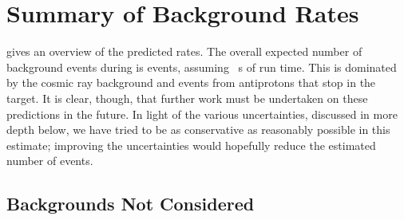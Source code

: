 %

\section{Summary of Background Rates}
\TabBackgroundFinalVals
{} gives an overview of the predicted rates.
The overall expected number of background events during \phaseII is \VarTotalBgPhasII events, assuming \VarRunTime~s of run time.
This is dominated by the cosmic ray background and events from antiprotons that stop in the target.
It is clear, though, that further work must be undertaken on these predictions in the future.
In light of the various uncertainties, discussed in more depth below, we have tried to be as conservative as reasonably possible in this estimate; improving the uncertainties would hopefully reduce the estimated number of events.

\subsection{Backgrounds Not Considered}
